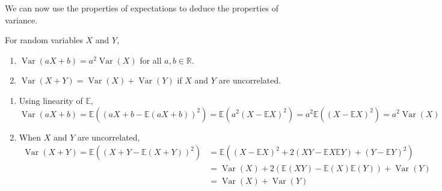 \documentclass{huhtakm-template-book}
\newcommand{\expect}{\mathbb{E}}
\DeclareMathOperator{\Var}{Var}
\begin{document}
We can now use the properties of expectations to deduce the properties of variance.
\begin{thm}
	For random variables $X$ and $Y$,
	\begin{enumerate}
		\item $\Var(aX+b)=a^{2}\Var(X)$ for all $a,b\in\mathbb{R}$.
		\item $\Var(X+Y)=\Var(X)+\Var(Y)$ if $X$ and $Y$ are uncorrelated.
	\end{enumerate}
\end{thm}
\begin{proofing}
	\begin{enumerate}
		\item Using linearity of $\expect$,
		\begin{equation*}
			\Var(aX+b)=\expect((aX+b-\expect(aX+b))^{2})=\expect(a^{2}(X-\expect X)^{2})=a^{2}\expect((X-\expect X)^{2})=a^{2}\Var(X)
		\end{equation*}
		\item When $X$ and $Y$ are uncorrelated,
		\begin{align*}
			\Var(X+Y)=\expect((X+Y-\expect(X+Y))^{2})&=\expect((X-\expect X)^{2}+2(XY-\expect X\expect Y)+(Y-\expect Y)^{2})\\
			&=\Var(X)+2(\expect(XY)-\expect(X)\expect(Y))+\Var(Y)\\
			&=\Var(X)+\Var(Y)
		\end{align*}
	\end{enumerate}
\end{proofing}
\end{document}

